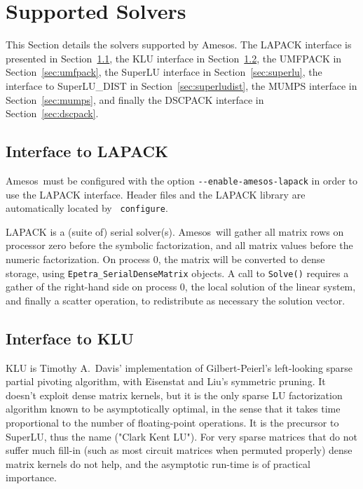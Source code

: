 \documentclass[11pt]{SANDreport}
\newcommand{\amesos}{{\sc Amesos}}
\begin{document}
\section{Supported Solvers}
\label{sec:classes}

This Section details the solvers supported by \amesos.
The LAPACK interface is presented in Section~\ref{sec:lapack}, the KLU
interface in Section~\ref{sec:klu}, the UMFPACK in Section~\ref{sec:umfpack},
  the SuperLU interface in Section~\ref{sec:superlu}, the interface to
  SuperLU\_DIST in Section~\ref{sec:superludist}, the MUMPS interface in
  Section~\ref{sec:mumps}, and finally the DSCPACK interface in
  Section~\ref{sec:dscpack}. 

\subsection{Interface to LAPACK}
\label{sec:lapack}

\amesos\ must be configured with the option
\verb!--enable-amesos-lapack! in order to use the LAPACK interface.
Header files and the LAPACK library are automatically located by {\tt
  configure}.

LAPACK is a (suite of) serial solver(s). \amesos\ will gather all matrix rows
on processor zero before the symbolic factorization, and all matrix values
before the numeric factorization. On process 0, the matrix will be converted
to dense storage, using \verb!Epetra_SerialDenseMatrix! objects.  A call to
\verb!Solve()! requires a gather of the right-hand side on process 0, the
local solution of the linear system, and finally a scatter operation, to
redistribute as necessary the solution vector.

\subsection{Interface to KLU}
\label{sec:klu}

KLU is Timothy A.~Davis' implementation of Gilbert-Peierl's left-looking sparse
partial pivoting algorithm, with Eisenstat and Liu's symmetric pruning.
It doesn't exploit dense matrix kernels, but it is the only sparse LU
factorization algorithm known to be asymptotically optimal, in the sense
that it takes time proportional to the number of floating-point
operations. It is the precursor to SuperLU, thus the name ("Clark Kent
LU"). For very sparse matrices that do not suffer much fill-in (such as
most circuit matrices when permuted properly) dense matrix kernels do
not help, and the asymptotic run-time is of practical importance.
\end{document}
